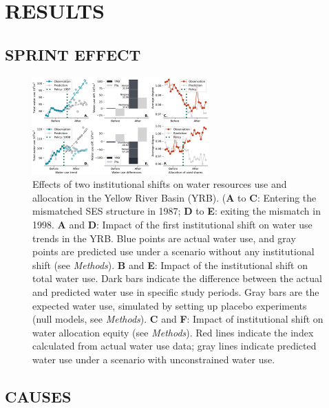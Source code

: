 \documentclass{nsr}
\begin{document}
\section{RESULTS}\label{results}
\subsection{SPRINT EFFECT}\label{phenomenon}


\begin{figure}
    \centering
    \includegraphics[width=16pc]{../../../figs/outputs/main_results.jpg}
    \caption{
        Effects of two institutional shifts on water resources use and allocation in the Yellow River Basin (YRB). (\textbf{A} to \textbf{C}: Entering the mismatched SES structure in 1987; \textbf{D} to \textbf{E}: exiting the mismatch in 1998. \textbf{A} and \textbf{D}: Impact of the first institutional shift on water use trends in the YRB. Blue points are actual water use, and gray points are predicted use under a scenario without any institutional shift (see \textit{Methods}). \textbf{B} and \textbf{E}: Impact of the institutional shift on total water use. Dark bars indicate the difference between the actual and predicted water use in specific study periods. Gray bars are the expected water use, simulated by setting up placebo experiments (null models, see \textit{Methods}). \textbf{C} and \textbf{F}: Impact of institutional shift on water allocation equity (see \textit{Methods}). Red lines indicate the index calculated from actual water use data; gray lines indicate predicted water use under a scenario with unconstrained water use.
    }
    \label{fig:main_results}
\end{figure}


\subsection{CAUSES}\label{causes}


\end{document}
